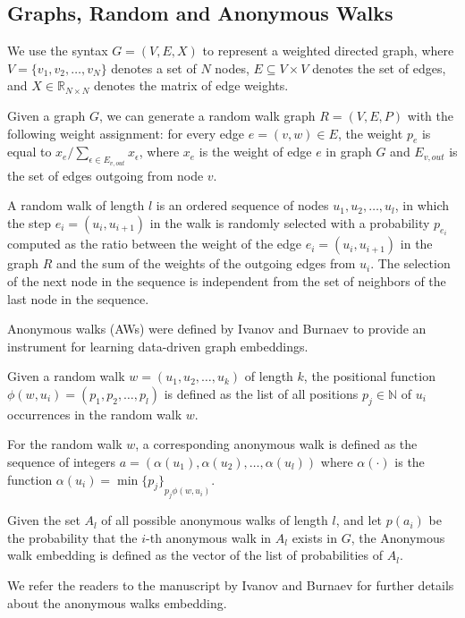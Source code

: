 \subsection{Graphs, Random and Anonymous Walks}\label{subsec:anonwalks}
We use the syntax $G=(V,E,X)$ to represent a weighted directed graph, where $V=\{v_1,v_2,\dots,v_N\}$ denotes a set of $N$ nodes, $E\subseteq V\times V$ denotes the set of edges, and $X\in\mathbb{R}_{N\times N}$ denotes the matrix of edge weights.


Given a graph $G$, we can generate a random walk graph $R=(V,E,P)$ with the following weight assignment: for every edge $e=(v,w)\in E$, the weight $p_e$ is equal to $x_e/\sum_{\epsilon\in E_{v,out}}{x_\epsilon}$, where $x_e$ is the weight of edge $e$ in graph $G$ and $E_{v,out}$ is the set of edges outgoing from node $v$.

A random walk of length $l$ is an ordered sequence of nodes $u_1, u_2,\dots, u_l$, in which the step $e_i=(u_i,u_{i+1})$ in the walk is randomly selected with a probability $p_{e_i}$ computed as the ratio between the weight of the edge $e_i=(u_i,u_{i+1})$ in the graph $R$ and the sum of the weights of the outgoing edges from $u_i$. The selection of the next node in the sequence is independent from the set of neighbors of the last node in the sequence.

Anonymous walks (AWs) were defined by Ivanov and Burnaev \cite{ivanov2018anonymous} to provide an instrument for learning data-driven graph embeddings.

Given a random walk $w=(u_1, u_2,\dots, u_k)$ of length $k$, the positional function $\phi(w, u_i)=(p_1,p_2,\dots,p_l)$ is defined as the list of all positions $p_j\in \mathbb{N}$ of $u_i$ occurrences in the random walk $w$.

For the random walk $w$, a corresponding anonymous walk is defined as the sequence of integers $a = (\alpha(u_1),\alpha(u_2),\dots,\alpha(u_l))$ where $\alpha(\cdot)$ is the function $\alpha(u_i) = \min{\{p_j\}}_{p_j\phi(w, u_i)}$.

Given the set $A_l$ of all possible anonymous walks of length $l$, and let $p(a_i)$ be the probability that  the $i$-th anonymous walk in $A_l$ exists in $G$, the Anonymous walk embedding is defined as the vector of the list of probabilities of $A_l$.

We refer the readers to the manuscript by Ivanov and Burnaev  \cite{ivanov2018anonymous} for further details about the anonymous walks embedding.


